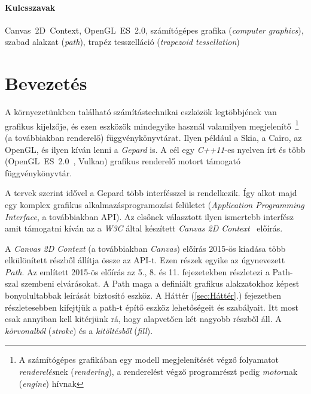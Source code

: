 \documentclass[12pt]{report}
\theoremstyle{definition}
\newcommand{\inenglish}[1]{\textsl{#1}}
\newcommand{\inenglishfn}[1]{\footnotesize{\inenglish{#1}}}
\begin{document}
    \subsubsection*{Kulcsszavak}

 Canvas~2D~Context, OpenGL~ES~2.0, számítógépes grafika (\inenglish{computer
 graphics}), szabad alakzat (\inenglish{path}), trapéz tesszelláció
 (\inenglish{trapezoid tessellation})



    \chapter*{Bevezetés}
    \label{sec:Bevezetés}

A környezetünkben található számítástechnikai eszközök legtöbbjének van
grafikus kijelzője, és ezen eszközök mindegyike használ valamilyen
megjelenítő~\footnote{A számítógépes grafikában egy modell megjelenítését végző
folyamatot \emph{renderelés}nek (\inenglishfn{rendering}), a renderelést végző
programrészt pedig \emph{motor}nak (\inenglishfn{engine}) hívnak} (a
továbbiakban renderelő) függvénykönyvtárat. Ilyen például a Skia, a Cairo, az
OpenGL, és ilyen kíván lenni a \emph{Gepard} is. A cél egy \emph{C++11}-es
nyelven írt és több (\mbox{OpenGL~ES~2.0 \cite{Munshi:2008:OEP:1481069}},
Vulkan) grafikus renderelő motort támogató függvénykönyvtár.

A tervek szerint idővel a Gepard több interfésszel is rendelkezik. Így alkot
majd egy komplex grafikus alkalmazásprogramozási felületet
(\inenglish{Application Programming Interface}, a továbbiakban API). Az elsőnek
választott ilyen ismertebb interfész amit támogatni kíván az a \emph{W3C} által
készített \emph{Canvas 2D Context}~\cite{Cabanier:14:HCC} előírás.

A \emph{Canvas 2D Context} (a továbbiakban \emph{Canvas}) előírás 2015-ös
kiadása több elkülönített részből állítja össze az API-t. Ezen részek egyike az
úgynevezett \emph{Path}. Az említett 2015-ös előírás az 5., 8. és 11.
fejezetekben részletezi a Path-szal szembeni elvárásokat. A Path maga a
definiált grafikus alakzatokhoz képest bonyolultabbak leírását biztosító
eszköz. A Háttér (\ref{sec:Háttér}.) fejezetben részletesebben kifejtjük a
path-t építő eszköz lehetőségeit és szabályait. Itt most csak annyiban kell
kitérjünk rá, hogy alapvetően két nagyobb részből áll. A \emph{körvonalból}
(\inenglish{stroke}) és a \emph{kitöltésből} (\inenglish{fill}).
\end{document}
